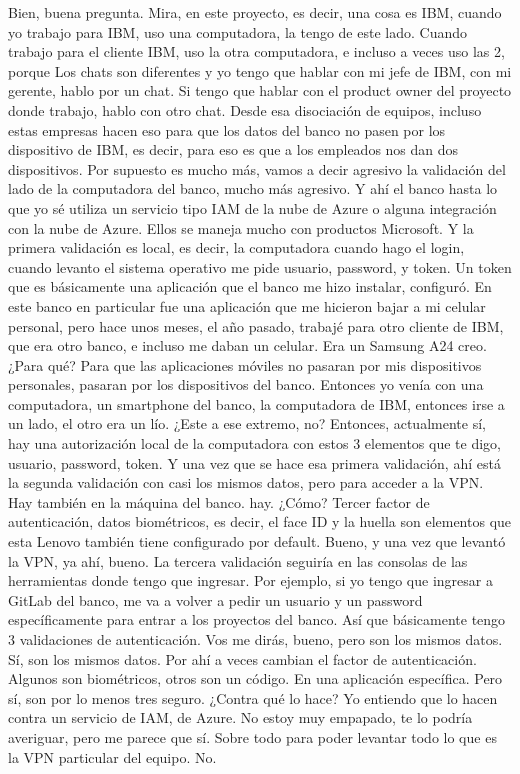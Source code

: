 \begin{description}[leftmargin=0cm, labelsep=0.5cm]
    \item[\textbf{VILLARINO PABLO RODOLFO:}] Bien, buena pregunta. Mira, en este proyecto, es decir, una cosa es IBM, cuando yo trabajo para IBM, uso una computadora, la tengo de este lado. Cuando trabajo para el cliente IBM, uso la otra computadora, e incluso a veces uso las 2, porque Los chats son diferentes y yo tengo que hablar con mi jefe de IBM, con mi gerente, hablo por un chat. Si tengo que hablar con el product owner del proyecto donde trabajo, hablo con otro chat. Desde esa disociación de equipos, incluso estas empresas hacen eso para que los datos del banco no pasen por los dispositivo de IBM, es decir, para eso es que a los empleados nos dan dos dispositivos. Por supuesto es mucho más, vamos a decir agresivo la validación del lado de la computadora del banco, mucho más agresivo. Y ahí el banco hasta lo que yo sé utiliza un servicio tipo IAM de la nube de Azure o alguna integración con la nube de Azure. Ellos se maneja mucho con productos Microsoft. Y la primera validación es local, es decir, la computadora cuando hago el login, cuando levanto el sistema operativo me pide usuario, password, y token. Un token que es básicamente una aplicación que el banco me hizo instalar, configuró. En este banco en particular fue una aplicación que me hicieron bajar a mi celular personal, pero hace unos meses, el año pasado, trabajé para otro cliente de IBM, que era otro banco, e incluso me daban un celular. Era un Samsung A24 creo. ¿Para qué? Para que las aplicaciones móviles no pasaran por mis dispositivos personales, pasaran por los dispositivos del banco. Entonces yo venía con una computadora, un smartphone del banco, la computadora de IBM, entonces irse a un lado, el otro era un lío. ¿Este a ese extremo, no? Entonces, actualmente sí, hay una autorización local de la computadora con estos 3 elementos que te digo, usuario, password, token. Y una vez que se hace esa primera validación, ahí está la segunda validación con casi los mismos datos, pero para acceder a la VPN. Hay también en la máquina del banco. hay. ¿Cómo? Tercer factor de autenticación, datos biométricos, es decir, el face ID y la huella son elementos que esta Lenovo también tiene configurado por default. Bueno, y una vez que levantó la VPN, ya ahí, bueno. La tercera validación seguiría en las consolas de las herramientas donde tengo que ingresar. Por ejemplo, si yo tengo que ingresar a GitLab del banco, me va a volver a pedir un usuario y un password específicamente para entrar a los proyectos del banco. Así que básicamente tengo 3 validaciones de autenticación. Vos me dirás, bueno, pero son los mismos datos. Sí, son los mismos datos. Por ahí a veces cambian el factor de autenticación. Algunos son biométricos, otros son un código. En una aplicación específica. Pero sí, son por lo menos tres seguro. ¿Contra qué lo hace? Yo entiendo que lo hacen contra un servicio de IAM, de Azure. No estoy muy empapado, te lo podría averiguar, pero me parece que sí. Sobre todo para poder levantar todo lo que es la VPN particular del equipo. No.


\end{description}
